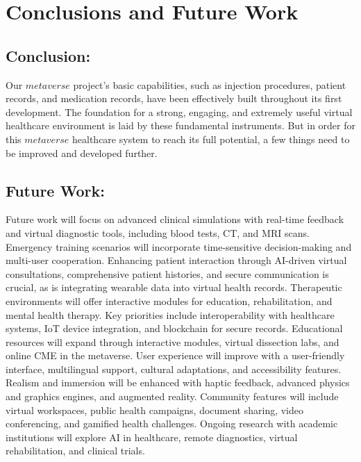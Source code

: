\chapter{Conclusions and Future Work}
\section{Conclusion:}
Our $metaverse$ project's basic capabilities, such as injection procedures, patient records, and medication records, have been effectively built throughout its first development. The foundation for a strong, engaging, and extremely useful virtual healthcare environment is laid by these fundamental instruments. But in order for this $metaverse$ healthcare system to reach its full potential, a few things need to be improved and developed further.
\section{Future Work:}
Future work will focus on advanced clinical simulations with real-time feedback and virtual diagnostic tools, including blood tests, CT, and MRI scans. Emergency training scenarios will incorporate time-sensitive decision-making and multi-user cooperation. Enhancing patient interaction through AI-driven virtual consultations, comprehensive patient histories, and secure communication is crucial, as is integrating wearable data into virtual health records. Therapeutic environments will offer interactive modules for education, rehabilitation, and mental health therapy. Key priorities include interoperability with healthcare systems, IoT device integration, and blockchain for secure records. Educational resources will expand through interactive modules, virtual dissection labs, and online CME in the metaverse. User experience will improve with a user-friendly interface, multilingual support, cultural adaptations, and accessibility features. Realism and immersion will be enhanced with haptic feedback, advanced physics and graphics engines, and augmented reality. Community features will include virtual workspaces, public health campaigns, document sharing, video conferencing, and gamified health challenges. Ongoing research with academic institutions will explore AI in healthcare, remote diagnostics, virtual rehabilitation, and clinical trials.
